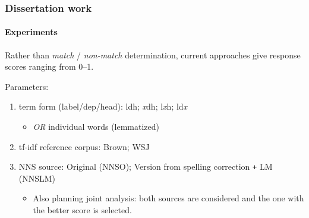 \documentclass{beamer}
\begin{document}
\begin{frame}
\frametitle{Dissertation work}
\framesubtitle{Experiments}

Rather than \textit{match} / \textit{non-match} determination, current approaches give response scores ranging from 0--1.
\bigskip

Parameters:
\smallskip

\begin{enumerate}
\item term form (label/dep/head): ldh; \textit{x}dh; l\textit{x}h; ld\textit{x}
\begin{itemize}
\item \textit{OR} individual words (lemmatized)
\end{itemize}
\smallskip
\item tf-idf reference corpus: Brown; WSJ
\medskip

\item NNS source: Original (NNSO); Version from spelling correction \texttt{+} LM (NNSLM)
\begin{itemize}
\item{Also planning joint analysis: both sources are considered and the one with the better score is selected.}
\end{itemize}
\end{enumerate}
\end{frame}
\end{document}

